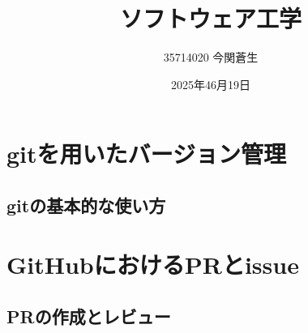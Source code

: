\documentclass[a4paper,11pt]{ltjsarticle}
\title{ソフトウェア工学}
\author{35714020 今関蒼生}
\date{2025年46月19日}
\begin{document}
\maketitle
%
%
\section{gitを用いたバージョン管理}
\subsection{gitの基本的な使い方}

\section{GitHubにおけるPRとissue}
\subsection{PRの作成とレビュー}
\end{document}
